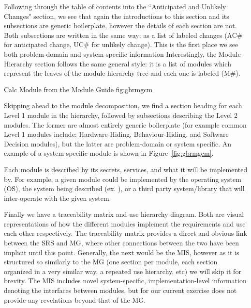 Following through the table of contents into the ``Anticipated and Unlikely 
Changes" section, we see that again the introductions to this section and 
its subsections are generic boilerplate, however the details of each section 
are not. Both subsections are written in the same way: as a list of labeled 
changes (AC\# for anticipated change, UC\# for unlikely change). This is the 
first place we see both problem-domain and system-specific information 
Interestingly, the Module Hierarchy section follows the same general style: it 
is a list of modules which represent the leaves of the module hierarchy tree 
and each one is labeled (M\#).

{Calc Module from the \gb{} Module Guide}
{fig:gbrmgcm}

Skipping ahead to the module decomposition, we find a section heading for each 
Level 1 module in the hierarchy, followed by subsections describing the Level 2 
modules. The former are almost entirely generic boilerplate (for example common 
Level 1 modules include: Hardware-Hiding, Behaviour-Hiding, and 
Software Decision modules), but the latter are problem-domain or system 
specific. An example of a system-specific module is shown in 
Figure~\ref{fig:gbrmgcm}. 

Each module is described by its secrets, services, and what it will be 
implemented by. For example, a given module could be implemented by the 
operating system (OS), the system being described (ex. \gb{}), or a third party 
system/library that will inter-operate with the given system.

Finally we have a traceability matrix and use hierarchy diagram. Both are 
visual representations of how the different modules implement the requirements 
and use each other respectively. The traceability matrix provides a direct and 
obvious link between the SRS and MG, where other connections between the two 
\sfs{} have been implicit until this point. Generally, the next \sf{} would be 
the MIS, however as it is structured so similarly to the MG (one section per 
module, each section organized in a very similar way, a repeated use hierarchy, 
etc) we will skip it for brevity. The MIS includes novel system-specific, 
implementation-level information denoting the interfaces between modules, but 
for our current exercise does not provide any revelations beyond that of the MG.

